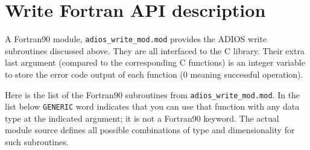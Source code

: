 %
%
%
%
%
%


\section{Write Fortran API description}
\label{section:write_fortran_api}

A Fortran90 module, \verb+adios_write_mod.mod+ provides the ADIOS write 
subroutines discussed above. 
They are all interfaced to the C library. Their extra last argument 
(compared to the corresponding C functions) is an integer variable to store 
the error code output of each function (0 meaning successful operation). 

Here is the list of the Fortran90 subroutines from \verb+adios_write_mod.mod+. 
In the list below \verb+GENERIC+ word indicates that you 
can use that function with any data type at the indicated argument; it is not
a Fortran90 keyword. The actual module source defines all possible combinations 
of type and dimensionality for such subroutines. 

